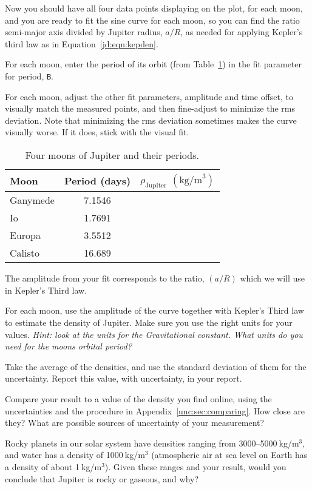 Now you should have all four data points displaying on the plot, for each moon, and you are ready to fit the sine curve for each moon, so you can find the ratio semi-major axis divided by Jupiter radius, $a/R$, as needed for applying Kepler's third law as in Equation\ \ref{jd:eqn:kepden}.

\begin{steps}
	\item For each moon, enter the period of its orbit (from Table\ \ref{jd:tab:periods}) in the fit parameter for period, \texttt{B}.
	
	\item For each moon, adjust the other fit parameters, amplitude and time offset, to visually match the measured points, and then fine-adjust to minimize the rms deviation. Note that minimizing the rms deviation sometimes makes the curve visually worse. If it does, stick with the visual fit.
\end{steps}

\begin{table}
	\centering
	\begin{tabular}{ l c r }
		\hline
		Moon & Period (days) & $\rho_\textrm{Jupiter}$ $(\textrm{kg/m}^3)$\\
		\hline
		Ganymede & 7.1546 & \\
		Io & 1.7691 & \\
		Europa & 3.5512 & \\
		Calisto & 16.689 & \\
		\hline  
	\end{tabular}
	\caption{Four moons of Jupiter and their periods.}\label{jd:tab:periods}
\end{table}

The amplitude from your fit corresponds to the ratio, $(a/R)$ which we will use in Kepler’s Third law.

\begin{steps}
	\item For each moon, use the amplitude of the curve together with Kepler's Third law
	to estimate the density of Jupiter. Make sure you use the right units for your values. \textit{Hint:
	look at the units for the Gravitational constant. What units do you need for the moons
	orbital period?}

	\item\label{jd:step:density} Take the average of the densities, and use the standard deviation of them for the uncertainty. Report this value, with uncertainty, in your report.
	
	\item Compare your result to a value of the density you find online, using the uncertainties and the procedure in Appendix~\ref{unc:sec:comparing}. How close are they? What are possible sources of uncertainty of your measurement?
	
	\item\label{jd:step:composition} Rocky planets in our solar system have densities ranging from 3000--5000$\:$kg/m$^3$, and water has a density of 1000$\:$kg/m$^3$ (atmospheric air at sea level on Earth has a density of about 1$\:$kg/m$^3$). Given these ranges and your result, would you conclude that Jupiter is rocky or gaseous, and why?
\end{steps}

